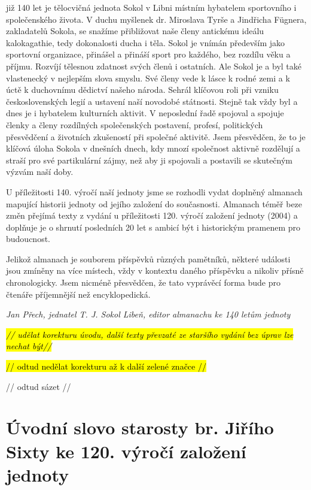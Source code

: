 již 140 let je tělocvičná jednota Sokol v Libni místním hybatelem
sportovního i společenského života. V duchu myšlenek dr. Miroslava Tyrše
a Jindřicha Fügnera, zakladatelů Sokola, se snažíme přibližovat naše
členy antickému ideálu kalokagathie, tedy dokonalosti ducha i těla.
Sokol je vnímán především jako sportovní organizace, přinášel a přináší
sport pro každého, bez rozdílu věku a příjmu. Rozvíjí tělesnou zdatnost
svých členů i ostatních. Ale Sokol je a byl také vlastenecký v nejlepším
slova smyslu. Své členy vede k lásce k rodné zemi a k úctě k duchovnímu
dědictví našeho národa. Sehrál klíčovou roli při vzniku československých
legií a ustavení naší novodobé státnosti. Stejně tak vždy byl a dnes je
i hybatelem kulturních aktivit. V neposlední řadě spojoval a spojuje
členky a členy rozdílných společenských postavení, profesí, politických
přesvědčení a životních zkušeností při společné aktivitě. Jsem
přesvědčen, že to je klíčová úloha Sokola v dnešních dnech, kdy mnozí
společnost aktivně rozdělují a straší pro své partikulární zájmy, než
aby ji spojovali a postavili se skutečným výzvám naší doby.

U příležitosti 140. výročí naší jednoty jsme se rozhodli vydat doplněný
almanach mapující historii jednoty od jejího založení do současnosti.
Almanach téměř beze změn přejímá texty z vydání u příležitosti 120.
výročí založení jednoty (2004) a doplňuje je o shrnutí posledních 20 let
s ambicí být i historickým pramenem pro budoucnost.

Jelikož almanach je souborem příspěvků různých pamětníků, některé
události jsou zmíněny na více místech, vždy v kontextu daného příspěvku
a nikoliv přísně chronologicky. Jsem nicméně přesvědčen, že tato
vyprávěcí forma bude pro čtenáře příjemnější než encyklopedická.

\emph{Jan Přech, jednatel T. J. Sokol Libeň, editor almanachu ke 140
letům jednoty}

\emph{\hl{// udělat korekturu úvodu, další texty převzaté ze staršího
vydání bez úprav lze nechat být//}}

\hl{// odtud nedělat korekturu až k další zelené značce //}

// odtud sázet //

\section{Úvodní slovo starosty br. Jiřího Sixty ke 120. výročí založení
jednoty}\label{uxfavodnuxed-slovo-starosty-br.-jiux159uxedho-sixty-ke-120.-vuxfdroux10duxed-zaloux17eenuxed-jednoty}

